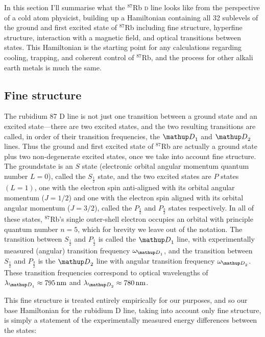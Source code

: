 In this section I'll summarise what the $^{87}$Rb \textsc{d} line looks like from the perspective of a cold atom physicist, building up a Hamiltonian containing all 32 sublevels of the ground and first excited state of $^{87}$Rb including fine structure, hyperfine structure, interaction with a magnetic field, and optical transitions between states. This Hamiltonian is the starting point for any calculations regarding cooling, trapping, and coherent control of $^{87}$Rb, and the process for other alkali earth metals is much the same.

\subsection{Fine structure}

The rubidium 87 D line is not just one transition between a ground state and an excited state---there are two excited states, and the two resulting transitions are called, in order of their transition frequencies, the $\up{D}_1$ and  $\up{D}_2$ lines. Thus the ground and first excited state of $^{87}$Rb are actually a ground state plus two non-degenerate excited states, once we take into account fine structure. The groundstate is an $S$ state (electronic orbital angular momentum quantum number $L=0$), called the $S_{\frac12}$ state, and the two excited states are $P$ states $(L=1)$, one with the electron spin anti-aligned with its orbital angular momentum ($J=1/2$) and one with the electron spin aligned with its orbital angular momentum ($J=3/2$), called the $P_{\frac12}$ and $P_\frac32$ states respectively. In all of these states, $^{87}$Rb's single outer-shell electron occupies an orbital with principle quantum number $n=5$, which for brevity we leave out of the notation. The transition between $S_{\frac12}$ and $P_{\frac12}$ is called the $\up{D}_1$ line, with experimentally measured (angular) transition frequency $\omega_{\up{D}_1}$, and the transition between $S_{\frac12}$ and $P_{\frac32}$ is the $\up{D}_2$ line with angular transition frequency $\omega_{\up{D}_2}$. These transition frequencies correspond to optical wavelengths of $\lambda_{\up{D}_1} \approx 795\unit{nm}$ and $\lambda_{\up{D}_2} \approx 780\unit{nm}$\cite{steck_rubidium_2010}.

This fine structure is treated entirely empirically for our purposes, and so our base Hamiltonian for the rubidium D line, taking into account only fine structure, is simply a statement of the experimentally measured energy differences between the states:

